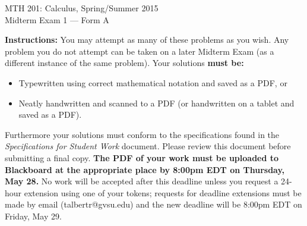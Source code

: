 \documentclass[addpoints]{exam}
\begin{document}
\begin{center}
	\begin{large}
		MTH 201: Calculus, Spring/Summer 2015 \\
		Midterm Exam 1 --- Form A
	\end{large}
\end{center}

\noindent
\textbf{Instructions:} You may attempt as many of these problems as you wish. Any problem you do not attempt can be taken on a later Midterm Exam (as a different instance of the same problem). Your solutions \textbf{must be:}
\begin{itemize}
	\item Typewritten using correct mathematical notation and saved as a PDF, or 
	\item Neatly handwritten and scanned to a PDF (or handwritten on a tablet and saved as a PDF). 
\end{itemize}
Furthermore your solutions must conform to the specifications found in the \emph{Specifications for Student Work} document. Please review this document before submitting a final copy. \textbf{The PDF of your work must be uploaded to Blackboard at the appropriate place by 8:00pm EDT on Thursday, May 28.} No work will be accepted after this deadline unless you request a 24-hour extension using one of your tokens; requests for deadline extensions must be made by email (talbertr@gvsu.edu) and the new deadline will be 8:00pm EDT on Friday, May 29. 

\hrulefill
\end{document}
